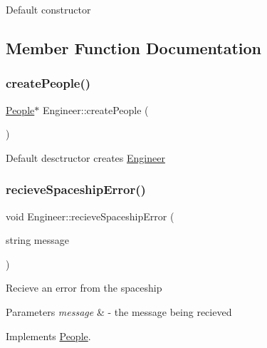 Default constructor 

\subsection{Member Function Documentation}
\mbox{\label{classEngineer_aaa9d760e22cab80ec283b2a085782feb}} 
\subsubsection{\texorpdfstring{create\+People()}{createPeople()}}
{\footnotesize\ttfamily \hyperlink{classPeople}{People}$\ast$ Engineer\+::create\+People (\begin{DoxyParamCaption}{ }\end{DoxyParamCaption})}

Default desctructor creates \hyperlink{classEngineer}{Engineer} \mbox{\label{classEngineer_acc86ce6b4b1388be8ebacc685f9e6233}} 
\subsubsection{\texorpdfstring{recieve\+Spaceship\+Error()}{recieveSpaceshipError()}}
{\footnotesize\ttfamily void Engineer\+::recieve\+Spaceship\+Error (\begin{DoxyParamCaption}\item[{string}]{message }\end{DoxyParamCaption})\hspace{0.3cm}{\ttfamily [virtual]}}

Recieve an error from the spaceship 
\begin{DoxyParams}{Parameters}
{\em message} & -\/ the message being recieved \\
\hline
\end{DoxyParams}


Implements \hyperlink{classPeople_a0685df78be631783138865e03cc7c85d}{People}.

\mbox{\label{classEngineer_ae60806f33b7f226891dbb7ad9b8a0c0b}} 
